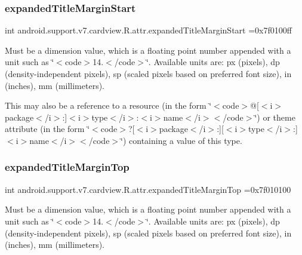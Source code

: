 \subsubsection{\texorpdfstring{expanded\+Title\+Margin\+Start}{expandedTitleMarginStart}}
{\footnotesize\ttfamily int android.\+support.\+v7.\+cardview.\+R.\+attr.\+expanded\+Title\+Margin\+Start =0x7f0100ff\hspace{0.3cm}{\ttfamily [static]}}

Must be a dimension value, which is a floating point number appended with a unit such as \char`\"{}$<$code$>$14.\+5sp$<$/code$>$\char`\"{}. Available units are\+: px (pixels), dp (density-\/independent pixels), sp (scaled pixels based on preferred font size), in (inches), mm (millimeters). 

This may also be a reference to a resource (in the form \char`\"{}$<$code$>$@\mbox{[}$<$i$>$package$<$/i$>$\+:\mbox{]}$<$i$>$type$<$/i$>$\+:$<$i$>$name$<$/i$>$$<$/code$>$\char`\"{}) or theme attribute (in the form \char`\"{}$<$code$>$?\mbox{[}$<$i$>$package$<$/i$>$\+:\mbox{]}\mbox{[}$<$i$>$type$<$/i$>$\+:\mbox{]}$<$i$>$name$<$/i$>$$<$/code$>$\char`\"{}) containing a value of this type. \mbox{\label{classandroid_1_1support_1_1v7_1_1cardview_1_1R_1_1attr_af2ccc3d944b206dbd73961344a8925bd}} 
\subsubsection{\texorpdfstring{expanded\+Title\+Margin\+Top}{expandedTitleMarginTop}}
{\footnotesize\ttfamily int android.\+support.\+v7.\+cardview.\+R.\+attr.\+expanded\+Title\+Margin\+Top =0x7f010100\hspace{0.3cm}{\ttfamily [static]}}

Must be a dimension value, which is a floating point number appended with a unit such as \char`\"{}$<$code$>$14.\+5sp$<$/code$>$\char`\"{}. Available units are\+: px (pixels), dp (density-\/independent pixels), sp (scaled pixels based on preferred font size), in (inches), mm (millimeters). 

